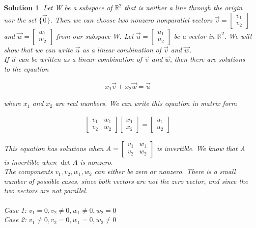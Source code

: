 \documentclass{article}
\newtheorem*{solution}{Solution}
\begin{document}
\begin{solution}
Let W be a subspace of $\mathbb{R}^2$ that is neither a line through the origin nor the set $\{ \vec{0} \}$. Then we can choose two nonzero nonparallel vectors $\vec{v} = \begin{bmatrix} v_{1} \\ v_{2} \end{bmatrix}$ and $\vec{w} = \begin{bmatrix} w_{1} \\ w_{2} \end{bmatrix}$ from our subspace W.  Let $\vec{u} = \begin{bmatrix} u_{1} \\ u_{2} \end{bmatrix}$ be a vector in $\mathbb{R}^2$. We will show that we can write $\vec{u}$ as a linear combination of $\vec{v}$ and $\vec{w}$. \\

If $\vec{u}$ can be written as a linear combination of $\vec{v}$ and $\vec{w}$, then there are solutions to the equation

\begin{align*}
x_{1} \vec{v} + x_{2} \vec{w} = \vec{u}
\end{align*}

where $x_{1}$ and $x_{2}$ are real numbers. We can write this equation in matrix form

\begin{align*}
\begin{bmatrix} v_{1} & w_{1} \\ v_{2} & w_{2} \end{bmatrix} \begin{bmatrix} x_{1} \\ x_{2} \end{bmatrix} = \begin{bmatrix} u_{1} \\ u_{2} \end{bmatrix} 
\end{align*}

This equation has solutions when $A = \begin{bmatrix} v_{1} & w_{1} \\ v_{2} & w_{2} \end{bmatrix}$ is invertible. We know that A is invertible when $\det A$ is nonzero. \\

The components $v_{1}, v_{2}, w_{1}, w_{2}$ can either be zero or nonzero. There is a small number of possible cases, since both vectors are not the zero vector, and since the two 
vectors are not parallel. 
\\ \\
\emph{Case 1: } $v_{1} = 0, v_{2} \neq 0, w_{1} \neq 0, w_{2} = 0$ \\
\emph{Case 2: } $v_{1} \neq 0, v_{2} = 0, w_{1} = 0, w_{2} \neq 0$ \\


\end{solution}
\end{document}
